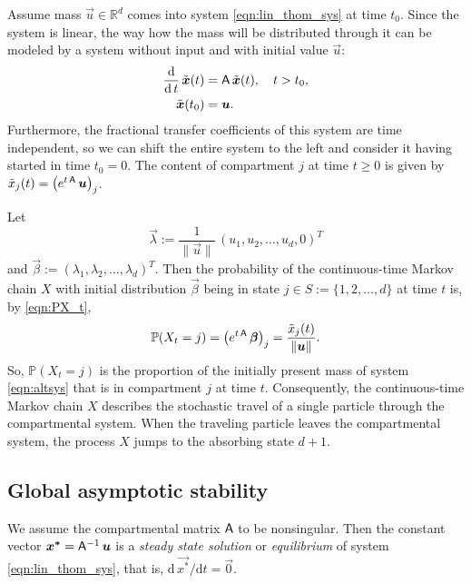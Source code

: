 \documentclass[smallextended]{svjour3}
\newcommand{\R}{\mathbb{R}}
\renewcommand{\P}{\mathbb{P}}
\newcommand{\deriv}[1]{\frac{\operatorname{d}}{\operatorname{d}#1}}
\begin{document}
Assume mass $\vec{u}\in\R^d$ comes into system \eqref{eqn:lin_thom_sys} at time $t_0$.
Since the system is linear, the way how the mass will be distributed through it can be modeled by a system without input and with initial value $\vec{u}$:
\begin{equation}\label{eqn:altsys}
\begin{aligned}
    \deriv{t}\,\tilde{\vec{x}}(t) &= \tens{A}\,\tilde{\vec{x}}(t),\quad t>t_0,\\
    \tilde{\vec{x}}(t_0) &= \vec{u}.
\end{aligned}
\end{equation}
Furthermore, the fractional transfer coefficients of this system are time independent, so we can shift the entire system to the left and consider it having started in time $t_0=0$.
The content of compartment $j$ at time $t\geq0$ is given by $\tilde{x}_j(t)=\left(e^{t\,\tens{A}}\,\vec{u}\right)_j$.

Let
\[
    \vec{\lambda}:=\frac{1}{\|\vec{u}\|}\,\left(u_1,u_2,\ldots,u_d,0\right)^T
\]
and $\vec{\beta}:=(\lambda_1,\lambda_2,\ldots,\lambda_d)^T$.
Then the probability of the continuous-time Markov chain $X$ with initial distribution $\vec{\beta}$ being in state $j\in S:=\{1,2,\ldots,d\}$ at time $t$ is, by \eqref{eqn:PX_t},
\[
    \P(X_t=j)=\left(e^{t\,\tens{A}}\,\vec{\beta}\right)_j = \frac{\tilde{x}_j(t)}{\|\vec{u}\|}.
\]
So, $\P(X_t=j)$ is the proportion of the initially present mass of system \eqref{eqn:altsys} that is in compartment $j$ at time $t$.
Consequently, the continuous-time Markov chain $X$ describes the stochastic travel of a single particle through the compartmental system.
When the traveling particle leaves the compartmental system, the process $X$ jumps to the absorbing state $d+1$.

\subsection{Global asymptotic stability}

We assume the compartmental matrix $\mathsf{A}$ to be nonsingular.
Then the constant vector $\vec{x^\ast} = \tens{A}^{-1}\,\vec{u}$ is a \emph{steady state solution} or \emph{equilibrium} of system \eqref{eqn:lin_thom_sys}, that is, $\mathrm{d}\,\vec{x^\ast}/\mathrm{d}t = \vec{0}$.
\end{document}
